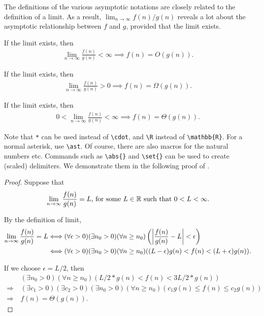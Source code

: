 \documentclass{homework}
\begin{document}
The definitions of the various asymptotic notations are closely related to the definition of a limit. As a result, $\lim_{n \to \infty} f(n) / g(n)$ reveals a lot about the asymptotic relationship between $f$ and $g$, provided that the limit exists.

\begin{lemma}
    If the limit exists, then
    \begin{align*}
        \lim_{n \to \infty} \frac{f(n)}{g(n)} < \infty \implies f(n) = O(g(n)).
    \end{align*}
\end{lemma}

\begin{lemma}
    If the limit exists, then
    \begin{align*}
        \lim_{n \to \infty} \frac{f(n)}{g(n)} > 0 \implies f(n) = \Omega(g(n)).
    \end{align*}
\end{lemma}

\begin{lemma}
    If the limit exists, then
    \begin{align*}
        0 < \lim_{n \to \infty} \frac{f(n)}{g(n)} < \infty \implies f(n) = \Theta(g(n)).
    \end{align*}
\end{lemma}

Note that \texttt{*} can be used instead of \verb|\cdot|, and \verb|\R| instead of \verb|\mathbb{R}|. For a normal asterisk, use \verb|\ast|. Of course, there are also macros for the natural numbers etc. Commands such as \verb|\abs{}| and \verb|\set{}| can be used to create (scaled) delimiters. We demonstrate them in the following proof of .

\begin{proof}
    Suppose that
    \begin{align*}
        \lim_{n \to \infty} \frac{f(n)}{g(n)} = L \text{, for some } L \in \mathbb R \text{ such that } 0 < L < \infty.
    \end{align*}

    By the definition of limit,
    \begin{align*}
        \lim_{n \to \infty} \frac{f(n)}{g(n)} = L & \Longleftrightarrow (\forall \epsilon > 0) (\exists n_0 > 0) (\forall n \geq n_0) \left( \abs{\frac{f(n)}{g(n)} - L} < \epsilon \right) \\
        & \Longleftrightarrow (\forall \epsilon > 0) (\exists n_0 > 0) (\forall n \geq n_0) ((L - \epsilon) g(n) < f(n) < (L + \epsilon) g(n)).
    \end{align*}

    If we choose $\epsilon = L/2$, then
    \begin{align*}
        & \ (\exists n_0 > 0) (\forall n \geq n_0) (L/2 * g(n) < f(n) < 3 L/2 * g(n)) \\
        \Longrightarrow & \ (\exists c_1 > 0) (\exists c_2 > 0) (\exists n_0 > 0) (\forall n \geq n_0) (c_1 g(n) \leq f(n) \leq c_2 g(n)) \\
        \Longrightarrow & \ f(n) = \Theta(g(n)).
    \end{align*}
\end{proof}
\end{document}
